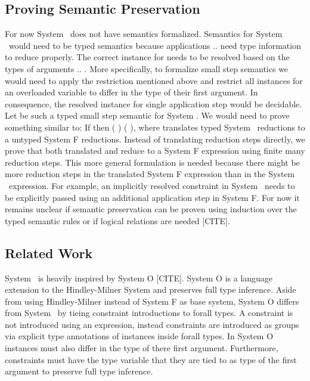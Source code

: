 \subsection{Proving Semantic Preservation }
For now System \Fo\ does not have semantics formalized.
Semantics for System \Fo\ would need to be typed semantics because applications     $..$   need type information to reduce properly.
The correct instance for  needs to be resolved based on the types of arguments  $..$ . 
More specifically, to formalize small step semantics we would need to apply the restriction mentioned above and restrict all instances for an overloaded variable  to differ in the type of their first argument. In consequence, the resolved instance for single application step     would be decidable.
Let    be such a typed small step semantic for System \Fo. We would need to prove something similar to: If    then  \Constr{[}  \Constr{]} (   )  (   ), where  translates typed System \Fo\ reductions to a untyped System F reductions.
Instead of translating reduction steps directly, we prove that both translated  and  reduce to a System F expression  using finite many reduction steps.
This more general formulation is needed because there might be more reduction steps in the translated System F expression than in the System \Fo\ expression. 
For example, an implicitly resolved constraint in System \Fo\ needs to be explicitly passed using an additional application step in System F. 
For now it remains unclear if semantic preservation can be proven using induction over the typed semantic rules or if logical relations are needed [CITE].

\subsection{Related Work}
System \Fo\ is heavily inspired by System O [CITE]. System O is a language extension to the Hindley-Milner System and preserves full type inference. 
Aside from using Hindley-Milner instead of System F as base system, System O differs from System \Fo\ by tieing constraint introductions to forall types. 
A constraint is not introduced using an expression, instead constraints are introduced as groups via explicit type annotations of instances inside forall types. 
In System O instances must also differ in the type of there first argument. 
Furthermore, constraints must have the type variable that they are tied to as type of the first argument to preserve full type inference.

